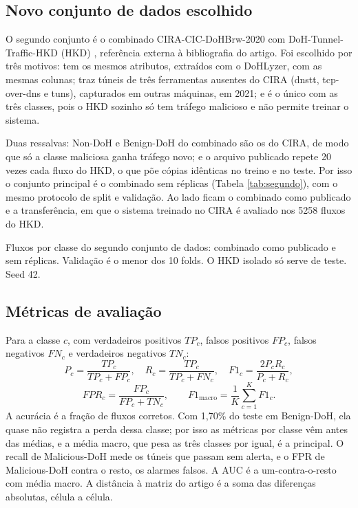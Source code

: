 \documentclass[conference]{IEEEtran}
\newcommand{\tabelacoluna}[1]{{\footnotesize\setlength{\tabcolsep}{3pt}%
  \begin{adjustbox}{max width=\columnwidth}\end{adjustbox}}}
\begin{document}
\subsection{Novo conjunto de dados escolhido}

O segundo conjunto é o combinado CIRA-CIC-DoHBrw-2020 com DoH-Tunnel-Traffic-HKD (HKD) \cite{mitsuhashi2023}, referência externa à bibliografia do artigo. Foi escolhido por três motivos: tem os mesmos atributos, extraídos com o DoHLyzer, com as mesmas colunas; traz túneis de três ferramentas ausentes do CIRA (dnstt, tcp-over-dns e tuns), capturados em outras máquinas, em 2021; e é o único com as três classes, pois o HKD sozinho só tem tráfego malicioso e não permite treinar o sistema.

Duas ressalvas: Non-DoH e Benign-DoH do combinado são os do CIRA, de modo que só a classe maliciosa ganha tráfego novo; e o arquivo publicado repete 20 vezes cada fluxo do HKD, o que põe cópias idênticas no treino e no teste. Por isso o conjunto principal é o combinado sem réplicas (Tabela \ref{tab:segundo}), com o mesmo protocolo de split e validação. Ao lado ficam o combinado como publicado e a transferência, em que o sistema treinado no CIRA é avaliado nos 5258 fluxos do HKD.

\begin{table}[!t]
\centering
\caption{Fluxos por classe do segundo conjunto de dados: combinado como publicado e sem réplicas. Validação é o menor dos 10 folds. O HKD isolado só serve de teste. Seed 42.}
\label{tab:segundo}
\tabelacoluna{dados_segundo_contagens}
\end{table}

\subsection{Métricas de avaliação}
\label{sec:metricas}

Para a classe $c$, com verdadeiros positivos $TP_c$, falsos positivos $FP_c$, falsos negativos $FN_c$ e verdadeiros negativos $TN_c$:
\begin{equation}
P_c = \frac{TP_c}{TP_c + FP_c},\quad
R_c = \frac{TP_c}{TP_c + FN_c},\quad
F1_c = \frac{2 P_c R_c}{P_c + R_c},
\end{equation}
\begin{equation}
FPR_c = \frac{FP_c}{FP_c + TN_c},\qquad
F1_{\text{macro}} = \frac{1}{K}\sum_{c=1}^{K} F1_c .
\end{equation}
A acurácia é a fração de fluxos corretos. Com 1,70\% do teste em Benign-DoH, ela quase não registra a perda dessa classe; por isso as métricas por classe vêm antes das médias, e a média macro, que pesa as três classes por igual, é a principal. O recall de Malicious-DoH mede os túneis que passam sem alerta, e o FPR de Malicious-DoH contra o resto, os alarmes falsos. A AUC é a um-contra-o-resto com média macro. A distância à matriz do artigo é a soma das diferenças absolutas, célula a célula.
\end{document}
